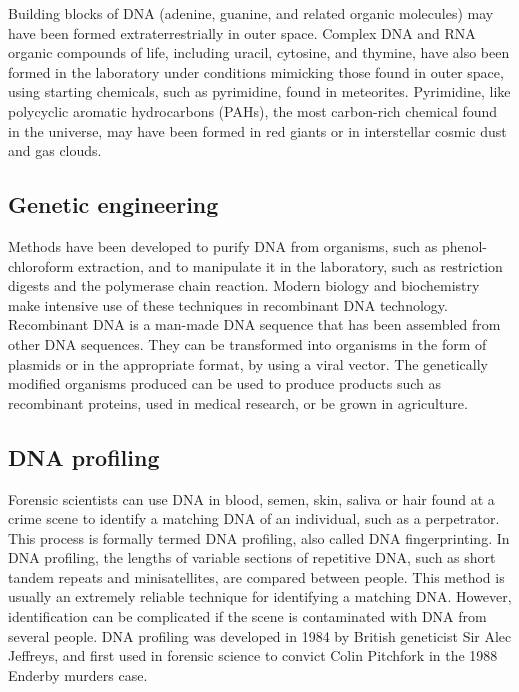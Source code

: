 Building blocks of DNA (adenine, guanine, and related organic molecules) may have been formed extraterrestrially in outer space. Complex DNA and RNA organic compounds of life, including uracil, cytosine, and thymine, have also been formed in the laboratory under conditions mimicking those found in outer space, using starting chemicals, such as pyrimidine, found in meteorites. Pyrimidine, like polycyclic aromatic hydrocarbons (PAHs), the most carbon-rich chemical found in the universe, may have been formed in red giants or in interstellar cosmic dust and gas clouds.

\hypertarget{genetic-engineering}{%
\subsection{Genetic engineering}\label{genetic-engineering}}

Methods have been developed to purify DNA from organisms, such as phenol-chloroform extraction, and to manipulate it in the laboratory, such as restriction digests and the polymerase chain reaction. Modern biology and biochemistry make intensive use of these techniques in recombinant DNA technology. Recombinant DNA is a man-made DNA sequence that has been assembled from other DNA sequences. They can be transformed into organisms in the form of plasmids or in the appropriate format, by using a viral vector. The genetically modified organisms produced can be used to produce products such as recombinant proteins, used in medical research, or be grown in agriculture.

\hypertarget{dna-profiling}{%
\subsection{DNA profiling}\label{dna-profiling}}

Forensic scientists can use DNA in blood, semen, skin, saliva or hair found at a crime scene to identify a matching DNA of an individual, such as a perpetrator. This process is formally termed DNA profiling, also called DNA fingerprinting. In DNA profiling, the lengths of variable sections of repetitive DNA, such as short tandem repeats and minisatellites, are compared between people. This method is usually an extremely reliable technique for identifying a matching DNA. However, identification can be complicated if the scene is contaminated with DNA from several people. DNA profiling was developed in 1984 by British geneticist Sir Alec Jeffreys, and first used in forensic science to convict Colin Pitchfork in the 1988 Enderby murders case.

